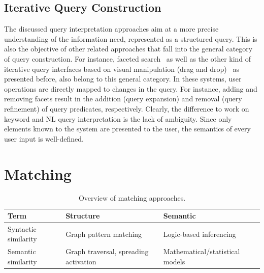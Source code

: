 

\subsection{Iterative Query Construction}

The discussed query interpretation approaches 
aim at a more precise understanding of the information need, represented as a structured query. This is also the objective of other related approaches that fall into the general category of query construction. For instance, faceted search~\cite{DBLP:conf/dexa/WagnerLT11,DBLP:conf/esws/HeimEZ10} as well as the other kind of iterative query interfaces based on visual manipulation (drag and drop)~\cite{DBLP:journals/ws/Harth10} as presented before, also belong to this general category. In these systems, user operations are directly mapped to changes in the query. For instance, adding and removing facets result in the addition (query expansion) and removal (query refinement) of query predicates, respectively. Clearly, the difference to work on keyword and NL query interpretation is the lack of ambiguity. Since only elements known to the system are presented to the user, the semantics of every user input is well-defined.
	
\section{Matching}\label{sec:matching}
\begin{table}[htbp]
  \centering
  \caption{Overview of matching approaches.}
    \begin{tabular}{|p{2.2cm}|p{2.7cm}|p{2.5cm}|}
    \hline
    \textbf{Term} & \textbf{Structure} & \textbf{Semantic} \bigstrut\\
    \hline
    \hline
    Syntactic similarity & Graph pattern matching  & Logic-based inferencing \bigstrut\\
    \hline
    Semantic similarity & Graph traversal, spreading activation & Mathematical/statistical models\bigstrut\\
    \hline
    \end{tabular}%
  \label{tab:matching}%
  \vspace{-0.5cm}
\end{table}%

